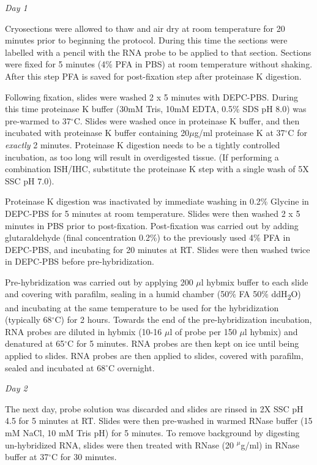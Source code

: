 \documentclass[onehalf,12pt]{beavtex}
\begin{document}
  \emph{Day 1}
  
  Cryosections were allowed to thaw and air dry at room temperature for 20
  minutes prior to beginning the protocol. During this time the sections
  were labelled with a pencil with the RNA probe to be applied to that
  section. Sections were fixed for 5 minutes (4\% PFA in PBS) at room
  temperature without shaking. After this step PFA is saved for
  post-fixation step after proteinase K digestion.
  
  Following fixation, slides were washed 2 x 5 minutes with DEPC-PBS.
  During this time proteinase K buffer (30mM Tris, 10mM EDTA, 0.5\% SDS pH
  8.0) was pre-warmed to 37\(^\circ\)C. Slides were washed once in
  proteinase K buffer, and then incubated with proteinase K buffer
  containing 20\(\mu\)g/ml proteinase K at 37\(^\circ\)C for
  \emph{exactly} 2 minutes. Proteinase K digestion needs to be a tightly
  controlled incubation, as too long will result in overdigested tissue.
  (If performing a combination ISH/IHC, substitute the proteinase K step
  with a single wash of 5X SSC pH 7.0).
  
  Proteinase K digestion was inactivated by immediate washing in 0.2\%
  Glycine in DEPC-PBS for 5 minutes at room temperature. Slides were then
  washed 2 x 5 minutes in PBS prior to post-fixation. Post-fixation was
  carried out by adding glutaraldehyde (final concentration 0.2\%) to the
  previously used 4\% PFA in DEPC-PBS, and incubating for 20 minutes at
  RT. Slides were then washed twice in DEPC-PBS before pre-hybridization.
  
  Pre-hybridization was carried out by applying 200 \(\mu\)l hybmix buffer
  to each slide and covering with parafilm, sealing in a humid chamber
  (50\% FA 50\% ddH\textsubscript{2}O) and incubating at the same
  temperature to be used for the hybridization (typically 68\(^\circ\)C)
  for 2 hours. Towards the end of the pre-hybridization incubation, RNA
  probes are diluted in hybmix (10-16 \(\mu\)l of probe per 150 \(\mu\)l
  hybmix) and denatured at 65\(^\circ\)C for 5 minutes. RNA probes are
  then kept on ice until being applied to slides. RNA probes are then
  applied to slides, covered with parafilm, sealed and incubated at
  68\(^\circ\)C overnight.
  
  \emph{Day 2}
  
  The next day, probe solution was discarded and slides are rinsed in 2X
  SSC pH 4.5 for 5 minutes at RT. Slides were then pre-washed in warmed
  RNase buffer (15 mM NaCl, 10 mM Tris pH) for 5 minutes. To remove
  background by digesting un-hybridized RNA, slides were then treated with
  RNase (20 \(^\mu\)g/ml) in RNase buffer at 37\(^\circ\)C for 30 minutes.
  
\end{document}
